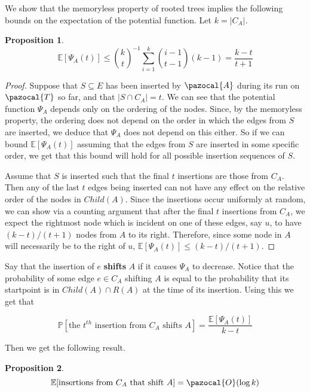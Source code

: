 \documentclass{article}
\newtheorem{proposition}{Proposition}
\begin{document}
We show that the memoryless property of rooted trees implies the following bounds on the expectation of the potential function. Let $k = \vert C_A \vert$.

\begin{proposition}
\[ \mathbb{E}[\Psi_A(t)] \leq \binom{k}{t}^{-1} \sum_{i=1}^k \binom{i-1}{t-1}(k-1) = \frac{k-t}{t+1} \]
\end{proposition}

\begin{proof}
Suppose that $S \subseteq E$ has been inserted by $\pazocal{A}$ during its run on $\pazocal{T}$ so far, and that $\vert S \cap C_A \vert = t$. We can see that the potential function $\Psi_A$ depends only on the ordering of the nodes. Since, by the memoryless property, the ordering does not depend on the order in which the edges from $S$ are inserted, we deduce that $\Psi_A$ does not depend on this either. So if we can bound $\mathbb{E}[\Psi_A(t)]$ assuming that the edges from $S$ are inserted in some specific order, we get that this bound will hold for all possible insertion sequences of $S$.

Assume that $S$ is inserted such that the final $t$ insertions are those from $C_A$. Then any of the last $t$ edges being inserted can not have any effect on the relative order of the nodes in $Child(A)$. Since the insertions occur uniformly at random, we can show via a counting argument that after the final $t$ insertions from $C_A$, we expect the rightmost node which is incident on one of these edges, say $u$, to have $(k-t)/(t+1)$ nodes from $A$ to its right. Therefore, since some node in $A$ will necessarily be to the right of $u$, $\mathbb{E}[\Psi_A(t)] \leq (k-t)/(t+1)$.
\end{proof}

Say that the insertion of $e$ \textbf{shifts} $A$ if it causes $\Psi_A$ to decrease. Notice that the probability of some edge $e \in C_A$ shifting $A$ is equal to the probability that its startpoint is in $Child(A) \cap R(A)$ at the time of its insertion. Using this we get that

\[  \mathbb{P}[\textrm{the $t^{th}$ insertion from $C_A$ shifts $A$}] = \frac{\mathbb{E}[\Psi_A(t)]}{k-t} \]

Then we get the following result.

\begin{proposition}
\[ \mathbb{E}[\textrm{insertions from $C_A$ that shift $A$}] = \pazocal{O}(\log k) \]
\end{proposition}
\end{document}
